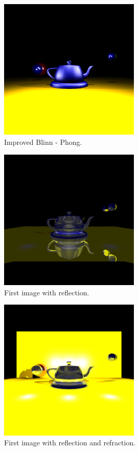 \documentclass[12pt]{article}
\begin{document}
\begin{figure}[h]
	\centering
	\includegraphics[width=0.6\textwidth]{image7.png}
	\caption{Improved Blinn - Phong.}
	\label{fig:image2}
\end{figure}

\begin{figure}[h]
	\centering
	\includegraphics[width=0.6\textwidth]{image12.png}
	\caption{First image with reflection.}
	\label{fig:image3}
\end{figure}

\begin{figure}[h]
	\centering
	\includegraphics[width=0.6\textwidth]{image19.png}
	\caption{First image with reflection and refraction.}
	\label{fig:image4}
\end{figure}
\end{document}
